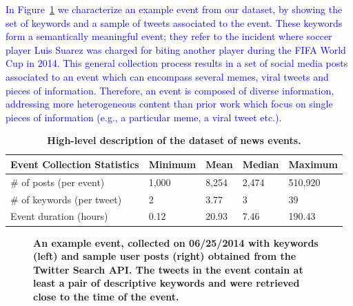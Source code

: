 \documentclass[10pt,letterpaper]{article}
\begin{document}
\textcolor{blue}{In Figure~\ref{fig:fig2} we characterize an example event from our
dataset, by showing the set of keywords and a sample of tweets
associated to the event. These keywords form a semantically meaningful
event; they refer to the incident where soccer player Luis Suarez was
charged for biting another player during the FIFA World Cup in
2014. This general collection process results in a set of social media
posts associated to an event which can encompass several memes, viral
tweets and pieces of information. Therefore, an event is composed of
diverse information, addressing more heterogeneous content than prior
work
\cite{Castillo:2014,Szabo:2010,Lerman:2010,Tatar:2011,Pinto:2013,Ahmed:2013,suh2010want}
which focus on single pieces of information (e.g., a
particular meme, a viral tweet etc.).}
\begin{table}
  \centering
  \begin{tabularx}{\textwidth}{@{}p{6cm}llll@{}}
    \toprule
    \textbf{Event Collection Statistics} & \textbf{Minimum} & \textbf{Mean} & \textbf{Median} & \textbf{Maximum} \\ \midrule
    \# of posts (per event) & 1,000 & 8,254 & 2,474 & 510,920 \\
    \# of keywords (per tweet) & 2 & 3.77 & 3 & 39 \\
    Event duration (hours) & 0.12 & 20.93 & 7.46 & 190.43 \\ \bottomrule
  \end{tabularx}
  \caption{\bf High-level description of the dataset of news events.} \label{table:dataset-stats}
\end{table}

\begin{figure}
  \caption{\textbf{An example event, collected on 06/25/2014
      with keywords (left) and sample user posts (right) obtained
      from the Twitter Search API. The tweets in the event contain at
      least a pair of descriptive keywords and were retrieved close to the time
      of the event.}}
  \label{fig:fig2}
\end{figure}
\end{document}
